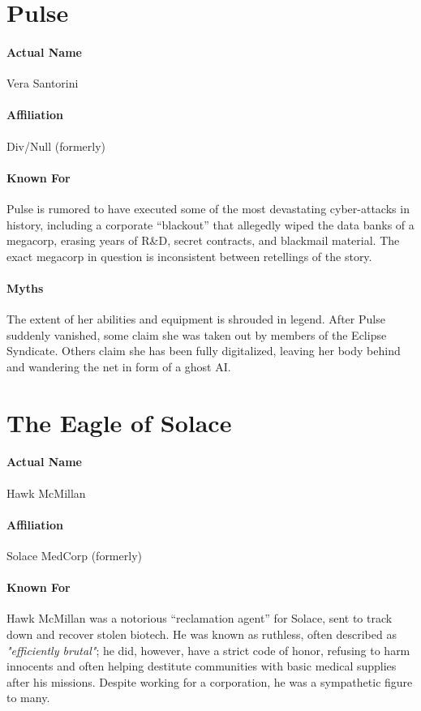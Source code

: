 \section*{Pulse}
\paragraph{Actual Name}
	Vera Santorini
\paragraph{Affiliation}
	Div/Null (formerly)
\paragraph{Known For}
	Pulse is rumored to have executed some of the most devastating cyber-attacks in history, including a corporate “blackout” that allegedly wiped the data banks of a megacorp, erasing years of R\&D, secret contracts, and blackmail material.
	The exact megacorp in question is inconsistent between retellings of the story.
\paragraph{Myths}
	The extent of her abilities and equipment is shrouded in legend.
	After Pulse suddenly vanished, some claim she was taken out by members of the Eclipse Syndicate.
	Others claim she has been fully digitalized, leaving her body behind and wandering the net in form of a ghost AI.

\section*{The Eagle of Solace}
\paragraph{Actual Name}
	Hawk McMillan
\paragraph{Affiliation}
	Solace MedCorp (formerly)
\paragraph{Known For}
	Hawk McMillan was a notorious “reclamation agent” for Solace, sent to track down and recover stolen biotech.
	He was known as ruthless, often described as \emph{"efficiently brutal"};
	he did, however, have a strict code of honor, refusing to harm innocents and often helping destitute communities with basic medical supplies after his missions.
	Despite working for a corporation, he was a sympathetic figure to many.
